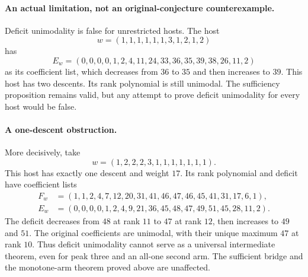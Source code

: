 \paragraph{An actual limitation, not an original-conjecture counterexample.}
Deficit unimodality is false for unrestricted hosts. The host
\[
 w=(1,1,1,1,1,1,3,1,2,1,2)
\]
has
\[
 E_w=(0,0,0,0,1,2,4,11,24,33,36,35,39,38,26,11,2)
\]
as its coefficient list, which decreases from $36$ to $35$ and
then increases to $39$. This host has two descents. Its rank
polynomial is still unimodal. The sufficiency proposition remains
valid, but any attempt to prove deficit unimodality for every host
would be false.

\paragraph{A one-descent obstruction.}
More decisively, take
\[
 w=(1,2,2,2,3,1,1,1,1,1,1,1).
\]
This host has exactly one descent and weight $17$. Its rank
polynomial and deficit have coefficient lists
\begin{align*}
 F_w&=(1,1,2,4,7,12,20,31,41,46,47,46,45,41,31,17,6,1),\\
 E_w&=(0,0,0,0,1,2,4,9,21,36,45,48,47,49,51,45,28,11,2).
\end{align*}
The deficit decreases from $48$ at rank $11$ to $47$ at rank
$12$, then increases to $49$ and $51$. The original coefficients
are unimodal, with their unique maximum $47$ at rank $10$.
Thus deficit unimodality cannot serve as a universal intermediate
theorem, even for peak three and an all-one second arm. The
sufficient bridge and the monotone-arm theorem proved above are
unaffected.

